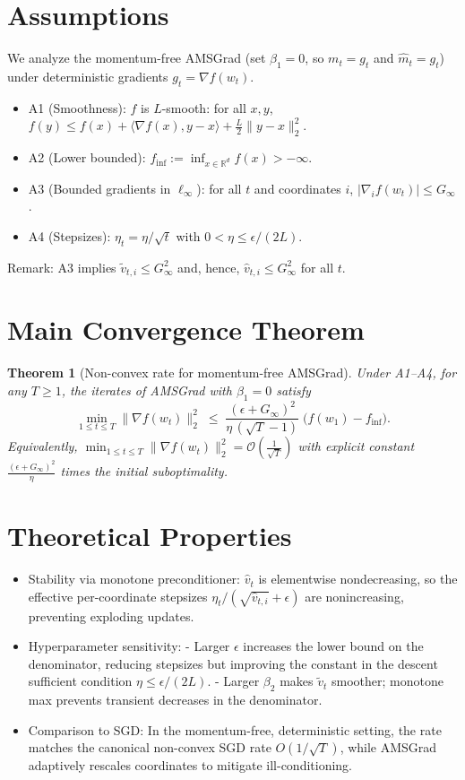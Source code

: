 \documentclass[11pt]{article}
\newtheorem{theorem}{Theorem}
\newcommand{\R}{\mathbb{R}}
\begin{document}
\section*{Assumptions}
We analyze the momentum-free AMSGrad (set $\beta_1=0$, so $m_t=g_t$ and $\hat m_t=g_t$) under deterministic gradients $g_t=\nabla f(w_t)$.
\begin{itemize}
\item A1 (Smoothness): $f$ is $L$-smooth: for all $x,y$, $f(y)\le f(x)+\langle \nabla f(x),y-x\rangle + \frac{L}{2}\|y-x\|_2^2$.
\item A2 (Lower bounded): $f_{\inf}:=\inf_{x\in\R^d} f(x)>-\infty$.
\item A3 (Bounded gradients in $\ell_\infty$): for all $t$ and coordinates $i$, $|\nabla_i f(w_t)|\le G_\infty$.
\item A4 (Stepsizes): $\eta_t = \eta/\sqrt{t}$ with $0<\eta \le \epsilon/(2L)$.
\end{itemize}
Remark: A3 implies $\tilde v_{t,i}\le G_\infty^2$ and, hence, $\hat v_{t,i}\le G_\infty^2$ for all $t$.

\section*{Main Convergence Theorem}
\begin{theorem}[Non-convex rate for momentum-free AMSGrad]
Under A1--A4, for any $T\ge 1$, the iterates of AMSGrad with $\beta_1=0$ satisfy
\[
\min_{1\le t\le T}\|\nabla f(w_t)\|_2^2
\;\le\;
\frac{( \epsilon + G_\infty )^2}{\eta\,( \sqrt{T}-1)}\;\big(f(w_1)-f_{\inf}\big).
\]
Equivalently, $\min_{1\le t\le T}\|\nabla f(w_t)\|_2^2 = \mathcal{O}\!\left(\frac{1}{\sqrt{T}}\right)$ with explicit constant $\frac{( \epsilon + G_\infty )^2}{\eta}$ times the initial suboptimality.
\end{theorem}

\section*{Theoretical Properties}
\begin{itemize}
\item Stability via monotone preconditioner: $\hat v_t$ is elementwise nondecreasing, so the effective per-coordinate stepsizes $\eta_t/(\sqrt{\hat v_{t,i}}+\epsilon)$ are nonincreasing, preventing exploding updates.
\item Hyperparameter sensitivity:
  - Larger $\epsilon$ increases the lower bound on the denominator, reducing stepsizes but improving the constant in the descent sufficient condition $\eta \le \epsilon/(2L)$.
  - Larger $\beta_2$ makes $\tilde v_t$ smoother; monotone max prevents transient decreases in the denominator.
\item Comparison to SGD: In the momentum-free, deterministic setting, the rate matches the canonical non-convex SGD rate $O(1/\sqrt{T})$, while AMSGrad adaptively rescales coordinates to mitigate ill-conditioning.
\end{itemize}
\end{document}
